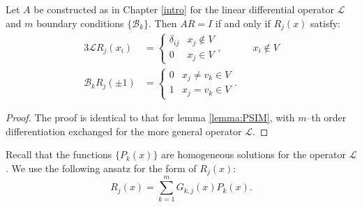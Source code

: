 \documentclass{book}
\begin{document}
\begin{lemma}
Let $A$ be constructed as in Chapter \ref{intro} for the linear differential operator $\mathcal{L}$ and $m$ boundary conditions $\{ \mathcal{B}_k \}$.
Then $AR = I$ if and only if $R_j(x)$ satisfy:
\begin{alignat}{3} \label{inverse conditions}
\mathcal{L} R_j(x_i) & = \begin{cases} \delta_{ij} & x_j \notin V \\ 0 & x_j \in V \end{cases}, && x_i \notin V \\
\mathcal{B}_k R_j(\pm 1) & = \begin{cases} 0 & x_j \neq v_k \in V \\ 1 & x_j = v_k \in V \end{cases} .
\end{alignat}
\end{lemma}

\begin{proof}
The proof is identical to that for lemma \ref{lemma:PSIM}, with $m$--th order differentiation exchanged for the more general operator $\mathcal{L}$.
\end{proof}


Recall that the functions $\{ P_k(x) \}$ are homogeneous solutions for the operator $\mathcal{L}$.
We use the following ansatz for the form of $R_j(x)$:
\begin{equation} \label{ansatz}
R_j(x) = \sum_{k=1}^m G_{k,j}(x) P_k(x) .
\end{equation}
\end{document}
